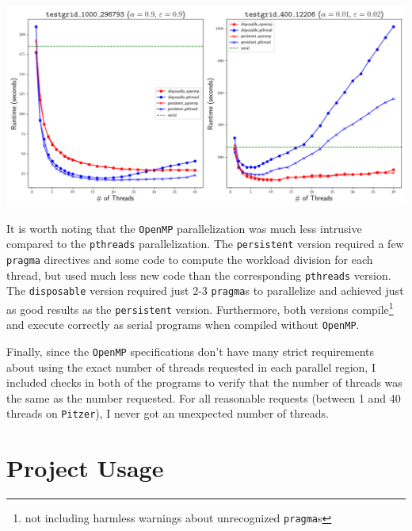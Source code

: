 \documentclass{article}
\begin{document}
\vspace{1em}
\begin{minipage}{\linewidth}
    \centering
    \includegraphics[width=.8\linewidth]{../results/plot.png}


    \label{fig:runtimes}
\end{minipage}

It is worth noting that the \texttt{OpenMP} parallelization was much less
intrusive compared to the \texttt{pthreads} parallelization. The
\texttt{persistent} version required a few \texttt{pragma} directives and some
code to compute the workload division for each thread, but used much less new
code than the corresponding \texttt{pthreads} version.  The \texttt{disposable}
version required just 2-3 \texttt{pragma}s to parallelize and achieved just as
good results as the \texttt{persistent} version. Furthermore, both versions
compile\footnote{not including harmless warnings about unrecognized
\texttt{pragma}s} and execute correctly as serial programs when compiled without
\texttt{OpenMP}.

Finally, since the \texttt{OpenMP} specifications don't have many strict
requirements about using the exact number of threads requested in each
parallel region, I included checks in both of the programs to verify that the
number of threads was the same as the number requested. For all reasonable
requests (between 1 and 40 threads on \texttt{Pitzer}), I never got an
unexpected number of threads.

\section*{Project Usage}
\label{sec:project}
\end{document}

